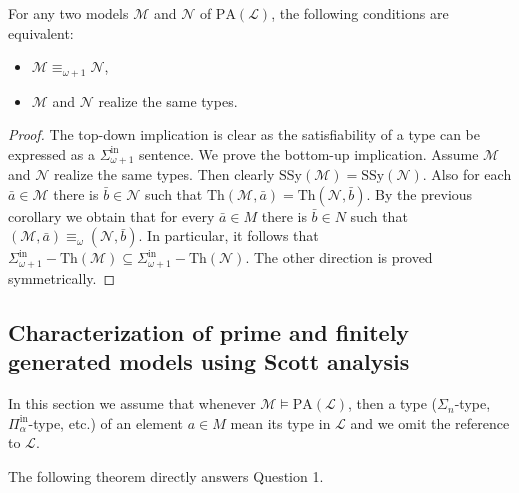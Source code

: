 \documentclass[11pt]{amsart}
\newcommand{\mc}[1]{\mathcal{#1}}
\newcommand{\Pinf}[1]{\Pi^{\mathrm{in}}_{#1}}
\newcommand{\Sinf}[1]{\Sigma^{\mathrm{in}}_{#1}}
\newcommand{\PA}{\mathrm{PA}}
\newcommand{\SSy}{\mathrm{SSy}}
\newcommand{\Th}{\mathrm{Th}}
\theoremstyle{remark}
\begin{document}
\begin{corollary} \label{lem:omega+1Equiv} 
    For any two models $\mathcal{M}$ and $\mathcal{N}$ of $\PA(\mathcal{L})$, the following conditions are equivalent:
    \begin{itemize}
        \item $\mathcal{M} \equiv_{\omega+1} \mathcal{N}$,
        \item $\mathcal{M}$ and $\mathcal{N}$ realize the same types.
    \end{itemize}
\end{corollary}
\begin{proof}
    The top-down implication is clear as the satisfiability of a type can be expressed as a $\Sinf{\omega+1}$ sentence. We prove the bottom-up implication. Assume $\mathcal{M}$ and $\mathcal{N}$ realize the same types. Then clearly $\SSy(\mc{M}) = \SSy(\mc{N})$. Also for each $\bar{a}\in \mc{M}$ there is $\bar{b}\in \mc{N}$ such that $\Th(\mc{M},\bar{a}) = \Th(\mc{N},\bar{b})$. By the previous corollary we obtain that for every $\bar{a}\in M$ there is $\bar{b}\in N$ such that $(\mc{M},\bar{a})\equiv_{\omega}(\mc{N}, \bar{b})$.
			In particular, it follows that $\Sinf{\omega+1}-\Th(\mc{M})\subseteq \Sinf{\omega+1}-\Th(\mc{N})$. The other direction is proved symmetrically.
\end{proof}


\subsection{Characterization of prime and finitely generated models using Scott analysis}

In this section we assume that whenever $\mathcal{M}\models \PA(\mc{L})$, then a type ($\Sigma_n$-type, $\Pinf{\alpha}$-type, etc.) of an element $a\in M$ mean its type in $\mathcal{L}$ and we omit the reference to $\mc{L}$.

The following theorem directly answers Question 1.
\end{document}
